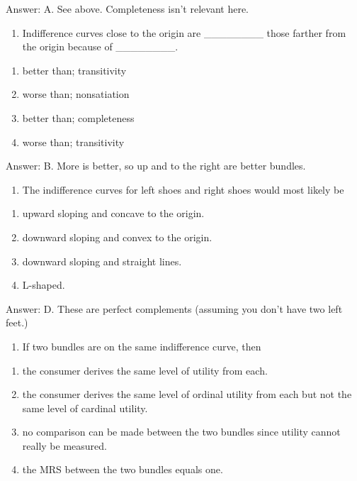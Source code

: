 \documentclass[11pt,]{article}
\providecommand{\tightlist}{%
  \setlength{\itemsep}{0pt}\setlength{\parskip}{0pt}}
\begin{document}
Answer: A. See above. Completeness isn't relevant here.

\begin{enumerate}
\def\labelenumi{\arabic{enumi})}
\setcounter{enumi}{9}
\tightlist
\item
  Indifference curves close to the origin are \_\_\_\_\_\_\_\_ those
  farther from the origin because of \_\_\_\_\_\_\_\_.
\end{enumerate}

\begin{enumerate}
\def\labelenumi{\Alph{enumi})}
\tightlist
\item
  better than; transitivity
\item
  worse than; nonsatiation
\item
  better than; completeness
\item
  worse than; transitivity
\end{enumerate}

Answer: B. More is better, so up and to the right are better bundles.

\begin{enumerate}
\def\labelenumi{\arabic{enumi})}
\setcounter{enumi}{10}
\tightlist
\item
  The indifference curves for left shoes and right shoes would most
  likely be
\end{enumerate}

\begin{enumerate}
\def\labelenumi{\Alph{enumi})}
\tightlist
\item
  upward sloping and concave to the origin.
\item
  downward sloping and convex to the origin.
\item
  downward sloping and straight lines.
\item
  L-shaped.
\end{enumerate}

Answer: D. These are perfect complements (assuming you don't have two
left feet.) \newpage

\begin{enumerate}
\def\labelenumi{\arabic{enumi})}
\setcounter{enumi}{11}
\tightlist
\item
  If two bundles are on the same indifference curve, then
\end{enumerate}

\begin{enumerate}
\def\labelenumi{\Alph{enumi})}
\tightlist
\item
  the consumer derives the same level of utility from each.
\item
  the consumer derives the same level of ordinal utility from each but
  not the same level of cardinal utility.
\item
  no comparison can be made between the two bundles since utility cannot
  really be measured.
\item
  the MRS between the two bundles equals one.
\end{enumerate}
\end{document}
